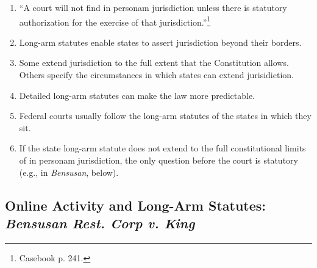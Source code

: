 \begin{enumerate}
    \item ``A court will not find in personam jurisdiction unless there is 
    statutory authorization for the exercise of that 
    jurisdiction.''\footnote{Casebook p. 241.}
    \item Long-arm statutes enable states to assert jurisdiction beyond their 
    borders.
    \item Some extend jurisdiction to the full extent that the Constitution 
    allows. Others specify the circumstances in which states can extend 
    jurisidiction.
    \item Detailed long-arm statutes can make the law more predictable.
    \item Federal courts usually follow the long-arm statutes of the states in 
    which they sit.
    \item If the state long-arm statute does not extend to the full 
    constitutional limits of in personam jurisdiction, the only question 
    before the court is statutory (e.g., in \emph{Bensusan}, below).

\end{enumerate}

\subsection{Online Activity and Long-Arm Statutes: \emph{Bensusan Rest. Corp 
v. King}}

